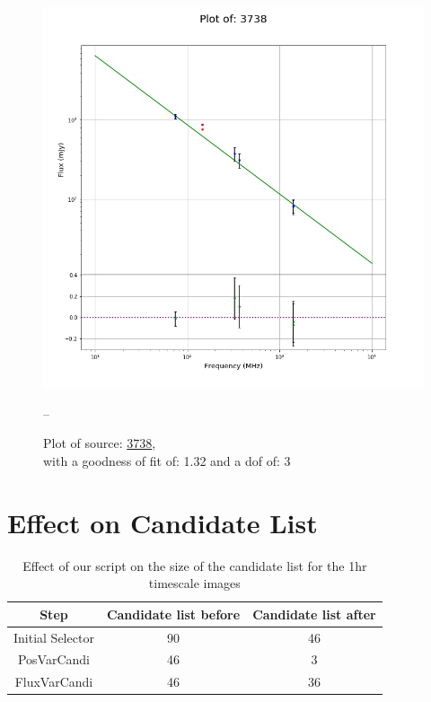 \documentclass{article}
\begin{document}
\begin{figure}[H]
    \centering
    \begin{minipage}{.5\textwidth}
        \centering
        \includegraphics[scale = 0.35]{KmeulenSimSource_1hr/1hr3738.png}
        \captionsetup{labelformat=empty}
        \caption{Plot of source: \href{http://banana.transientskp.org/r4/vlo_KmeulenSimSource/runningcatalog/3738}{3738},\\with a goodness of fit of: 1.32 and a dof of: 3}
        \addtocounter{figure}{-1}
        \label{KmeulenSimSource:1hr:3738:plot}
    \end{minipage}%
    \begin{minipage}{0.5\textwidth}
        \centering

--
        \end{minipage}
\end{figure}
\section{Effect on Candidate List}
\begin{table}[H]
    \centering
    \begin{tabular}{|c| c | c|}
    \toprule
     Step & Candidate list before & Candidate list after\\
    \midrule
        Initial Selector & 90 & 46 \\
        PosVarCandi & 46 & 3 \\
        FluxVarCandi & 46 & 36  \\
        \midrule
    \end{tabular}
    \caption{Effect of our script on the size of the candidate list for the 1hr timescale images}
    \label{KmeulenSimSource:1hr:overviewcandidates}
\end{table}
\end{document}
